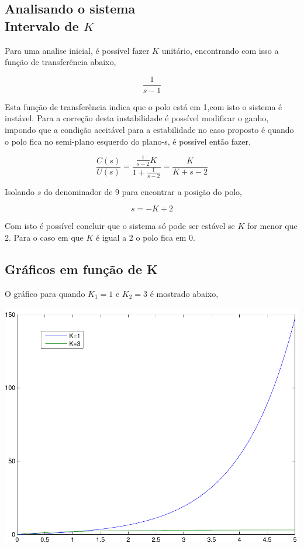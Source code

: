 \documentclass[paper=a4, fontsize=11pt]{article}
\begin{document}
\subsection{Analisando o sistema\\Intervalo de $K$}

Para uma analise inicial, é possível fazer $K$ unitário, encontrando com isso a
função de transferência abaixo,

\begin{equation}
    \frac{1}{s-1}
\end{equation}

Esta função de transferência indica que o polo está em 1,com isto 
o sistema é instável. Para a correção desta instabilidade é possível
modificar o ganho, impondo que a condição aceitável para a estabilidade
no caso proposto é quando o polo fica no semi-plano esquerdo do plano-s, 
é possível então fazer,

\begin{equation}
    \frac{C(s)}{U(s)} = \frac{\frac{1}{s-2} K}{1 + \frac{1}{s-2} } = \frac{K}{K+s-2}
\end{equation}

Isolando $s$ do denominador de 9 para encontrar a posição do polo,

\begin{equation}
    s = - K + 2
\end{equation}

Com isto é possível concluir que o sistema só pode ser estável se $K$ for menor que 2.
Para o caso em que $K$ é igual a 2 o polo fica em 0.

\subsection{Gráficos em função de K}

O gráfico para quando $K_1=1$ e $K_2=3$ é mostrado abaixo,

\begin{center}
    \includegraphics[scale=0.5]{q3ib.pdf}
\end{center}
\end{document}
